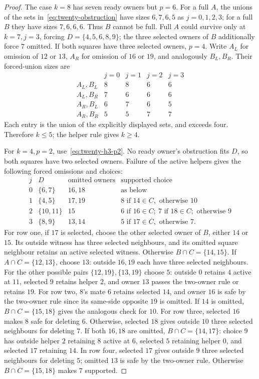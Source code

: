 \begin{proof}
The case $k=8$ has seven ready owners but $p=6$. For a full $A$, the unions
of the sets in~\eqref{eq:twenty-obstruction} have sizes $6,7,6,5$ as
$j=0,1,2,3$; for a full $B$ they have sizes $7,6,6,6$. Thus $B$ cannot be
full. Full $A$ could survive only at $k=7,j=3$, forcing
$D=\{4,5,6,8,9\}$; the three selected owners of $B$ additionally force $7$
omitted. If both squares have three selected owners, $p=4$. Write $A_L$
for omission of $12$ or $13$, $A_R$ for omission of $16$ or $19$, and
analogously $B_L,B_R$. Their forced-union sizes are
\[
\begin{array}{c|rrrr}
&j=0&j=1&j=2&j=3\\\hline
A_L,B_L&8&8&6&6\\
A_L,B_R&7&6&6&6\\
A_R,B_L&6&7&6&5\\
A_R,B_R&5&5&7&7
\end{array}
\]
Each entry is the union of the explicitly displayed sets, and exceeds four.
Therefore $k\le5$; the helper rule gives $k\ge4$.

For $k=4,p=2$, use~\eqref{eq:twenty-h3-p2}. No ready owner's obstruction
fits $D$, so both squares have two selected owners. Failure of the active
helpers gives the following forced omissions and choices:
\[
\begin{array}{c|c|c|l}
j&D&\text{omitted owners}&\text{supported choice}\\\hline
0&\{6,7\}&16,18&\text{as below}\\
1&\{4,5\}&17,19&8\text{ if }14\in C,\text{ otherwise }10\\
2&\{10,11\}&15&6\text{ if }16\in C;\ 7\text{ if }18\in C;\text{ otherwise }9\\
3&\{8,9\}&13,14&5\text{ if }17\in C,\text{ otherwise }7.
\end{array}
\]
For row one, if $17$ is selected, choose the other selected owner of $B$,
either $14$ or $15$. Its outside witness has three selected neighbours,
and its omitted square neighbour retains an active selected witness.
Otherwise $B\cap C=\{14,15\}$. If $A\cap C=\{12,13\}$, choose $13$:
outside $16,19$ each have three selected neighbours. For the other possible
pairs $\{12,19\},\{13,19\}$ choose $5$: outside $0$ retains $4$ active
at $11$, selected $9$ retains helper $2$, and owner $13$ passes the
two-owner rule or retains $19$.
For row two, $8$'s mate $6$ retains selected $14$, and owner $16$ is safe
by the two-owner rule since its same-side opposite $19$ is omitted. If $14$
is omitted, $B\cap C=\{15,18\}$ gives the analogous check for $10$.
For row three, selected $16$ makes $8$ safe for deleting $6$. Otherwise,
selected $18$ gives outside $10$ three selected neighbours for deleting $7$.
If both $16,18$ are omitted, $B\cap C=\{14,17\}$: choice $9$ has outside
helper $2$ retaining $8$ active at $6$, selected $5$ retaining helper $0$,
and selected $17$ retaining $14$. In row four, selected $17$ gives outside
$9$ three selected neighbours for deleting $5$; omitted $13$ is safe by the
two-owner rule. Otherwise $B\cap C=\{15,18\}$ makes $7$ supported.


\end{proof}
